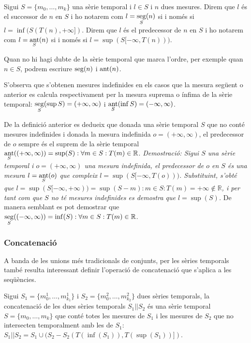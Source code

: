 \begin{definition}
  Sigui $S=\{m_0, \ldots, m_k\}$ una sèrie temporal i $l\in S$ i $n$ dues
  mesures. Direm que $l$ és el successor de $n$ en $S$ i ho notarem
  com $l=\operatorname*{seg}\limits_S(n)$ si i només si $l=\inf(S(T(n),+\infty])$.
  Direm que $l$ és el predecessor de $n$ en $S$ i ho notarem com
  $l=\operatorname*{ant}\limits_S(n)$ si i només si $l=\sup(S[-\infty,T(n)))$.

Quan no hi hagi dubte de la sèrie temporal que marca l'ordre, per
exemple quan $n\in S$, podrem escriure $\operatorname*{seg}(n)$ i $\operatorname*{ant}(n)$.
\end{definition}

S'observa que s'obtenen mesures indefinides en els casos que la
mesura següent o anterior es calcula respectivament per la mesura
suprema o ínfima de la sèrie temporal: $\operatorname*{seg}\limits_S(\sup
S)=(+\infty,\infty)$ i $\operatorname*{ant}\limits_S(\inf S)=(-\infty,\infty)$.

De la definició anterior es dedueix que donada una sèrie temporal $S$
que no conté mesures indefinides i donada la mesura indefinida
$o=(+\infty,\infty)$, el predecessor de $o$ sempre és el suprem de la
sèrie temporal $\operatorname*{ant}\limits_S( (+\infty,\infty) ) = \sup(S): \forall
m\in S: T(m)\in\mathbb{R}$.  %
\emph{Demostració: Sigui $S$ una sèrie temporal i $o=(+\infty,\infty)$
  una mesura indefinida, el predecessor de $o$ en $S$ és una mesura
  $l=\operatorname*{ant}\limits_S(o)$ que compleix
  $l=\sup(S[-\infty,T(o)))$. Substituint, s'obté que
  $l=\sup(S[-\infty,+\infty))=\sup(S-m):m\in S:T(m)=+\infty \notin
  \mathbb{R}$, i per tant com que $S$ no té mesures indefinides es
  demostra que $l=\sup(S)$.  } De manera semblant es pot demostrar que
$\operatorname*{seg}\limits_S( (-\infty,\infty) ) = \inf(S): \forall m\in S:
T(m)\in\mathbb{R}$.


\subsubsection{Concatenació}

A banda de les unions més tradicionals de conjunts, per les sèries
temporals també resulta interessant definir l'operació de concatenació
que s'aplica a les seqüències.

\begin{definition}[concatenació]
  Sigui $S_1=\{m_0^1, \dotsc, m_{k_1}^1\}$ i $S_2=\{m_0^2, \dotsc,
  m_{k_2}^2\}$ dues sèries temporals, la concatenació de les dues
  sèries temporals $S_1 || S_2$ és una sèrie temporal $S=\{m_0,
  \dotsc, m_k\}$ que conté totes les mesures de $S_1$ i les mesures de
  $S_2$ que no intersecten temporalment amb les de $S_1$: $S_1 ||
  S_2 =  S_1 \cup ( S_2 - S_2(T(\inf(S_1)),T(\sup(S_1))] )$.
\end{definition}

